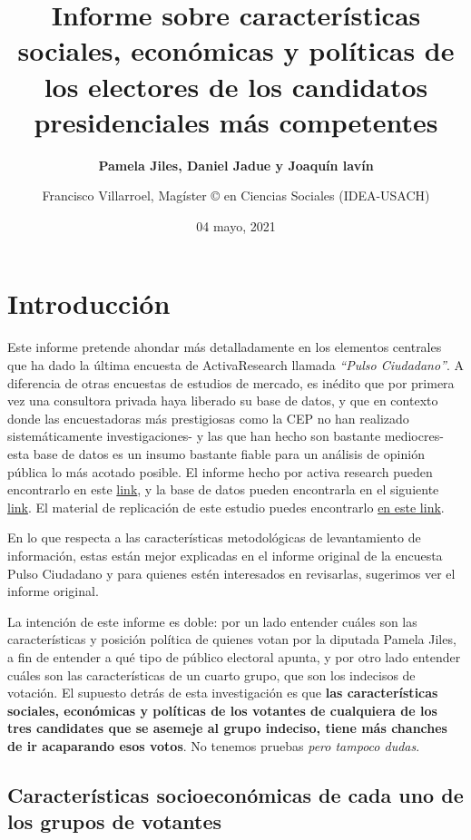 \documentclass[
]{article}
\title{\textbf{Informe sobre características sociales, económicas y políticas
de los electores de los candidatos presidenciales más competentes}}
\subtitle{\textbf{Pamela Jiles, Daniel Jadue y Joaquín lavín}}
\author{Francisco Villarroel, Magíster © en Ciencias Sociales (IDEA-USACH)}
\date{04 mayo, 2021}
\begin{document}
\maketitle

\hypertarget{introducciuxf3n}{%
\section{\texorpdfstring{\textbf{Introducción}}{Introducción}}\label{introducciuxf3n}}

Este informe pretende ahondar más detalladamente en los elementos
centrales que ha dado la última encuesta de ActivaResearch llamada
\emph{``Pulso Ciudadano''}. A diferencia de otras encuestas de estudios
de mercado, es inédito que por primera vez una consultora privada haya
liberado su base de datos, y que en contexto donde las encuestadoras más
prestigiosas como la CEP no han realizado sistemáticamente
investigaciones- y las que han hecho son bastante mediocres- esta base
de datos es un insumo bastante fiable para un análisis de opinión
pública lo más acotado posible. El informe hecho por activa research
pueden encontrarlo en este
\href{https://chile.activasite.com/wp-content/uploads/2021/05/Pulso_Ciudadano_ABRIL_Q2.pdf}{link},
y la base de datos pueden encontrarla en el siguiente
\href{https://chile.activasite.com/wp-content/uploads/2021/05/BBDD_Pulso-Abril-Q2_.zip}{link}.
El material de replicación de este estudio puedes encontrarlo
\href{https://github.com/francisco-vr/Pulso_Ciudadano}{en este link}.

En lo que respecta a las características metodológicas de levantamiento
de información, estas están mejor explicadas en el informe original de
la encuesta Pulso Ciudadano y para quienes estén interesados en
revisarlas, sugerimos ver el informe original.

La intención de este informe es doble: por un lado entender cuáles son
las características y posición política de quienes votan por la diputada
Pamela Jiles, a fin de entender a qué tipo de público electoral apunta,
y por otro lado entender cuáles son las características de un cuarto
grupo, que son los indecisos de votación. El supuesto detrás de esta
investigación es que \textbf{las características sociales, económicas y
políticas de los votantes de cualquiera de los tres candidates que se
asemeje al grupo indeciso, tiene más chanches de ir acaparando esos
votos}. No tenemos pruebas \emph{pero tampoco dudas}.

\hypertarget{caracteruxedsticas-socioeconuxf3micas-de-cada-uno-de-los-grupos-de-votantes}{%
\subsection{\texorpdfstring{\textbf{Características socioeconómicas de
cada uno de los grupos de
votantes}}{Características socioeconómicas de cada uno de los grupos de votantes}}\label{caracteruxedsticas-socioeconuxf3micas-de-cada-uno-de-los-grupos-de-votantes}}
\end{document}
